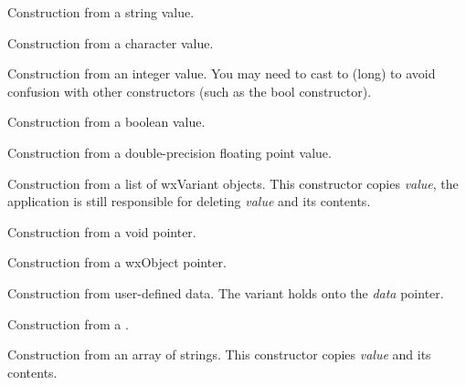 Construction from a string value.


Construction from a character value.


Construction from an integer value. You may need to cast to (long) to
avoid confusion with other constructors (such as the bool constructor).


Construction from a boolean value.


Construction from a double-precision floating point value.


Construction from a list of wxVariant objects. This constructor
copies {\it value}, the application is still responsible for
deleting {\it value} and its contents.


Construction from a void pointer.


Construction from a wxObject pointer.


Construction from user-defined data.  The variant holds onto the {\it data} pointer.


Construction from a .


Construction from an array of strings.  This constructor copies {\it value} and its contents.


